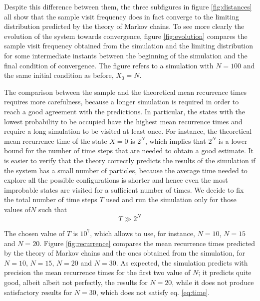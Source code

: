 Despite this difference between them, the three subfigures in figure \ref{fig:distances} all show that the sample visit frequency does in fact converge to the limiting distribution predicted by the theory of Markov chains. To see more clearly the evolution of the system towards convergence, figure \ref{fig:evolution} compares the sample visit frequency obtained from the simulation and the limiting distribution for some intermediate instants between the beginning of the simulation and the final condition of convergence. The figure refers to a simulation with $N = 100$ and the same initial condition as before, \ie $X_0 = N$. 

\medskip
The comparison between the sample and the theoretical mean recurrence times requires more carefulness, because a longer simulation is required in order to reach a good agreement with the predictions. In particular, the states with the lowest probability to be occupied have the highest mean recurrence times and require a long simulation to be visited at least once. For instance, the theoretical mean recurrence time of the state $X= 0$ is $2^N$, which implies that $2^N$ is a lower bound for the number of time steps that are needed to obtain a good estimate. It is easier to verify that the theory correctly predicts the results of the simulation if the system has a small number of particles, because the average time needed to explore all the possible configurations is shorter and hence even the most improbable states are visited for a sufficient number of times. We decide to fix the total number of time steps $T$ used and run the simulation only for those values of$N$ such that
\begin{equation}\label{eq:time}
  T \gg 2^N
\end{equation}

The chosen value of $T$ is $10^7$, which allows to use, for instance, $N= 10$, $N= 15$ and $N= 20$.
Figure \ref{fig:recurrence} compares the mean recurrence times predicted by the theory of Markov chains and the ones obtained from the simulation, for $N= 10$, $N= 15$, $N= 20$ and $N= 30$. As expected, the simulation predicts with precision the mean recurrence times for the first two value of $N$; it predicts quite good, albeit albeit not perfectly, the results for $N = 20$, while it does not produce satisfactory results for $N= 30$, which does not satisfy eq. \ref{eq:time}.

